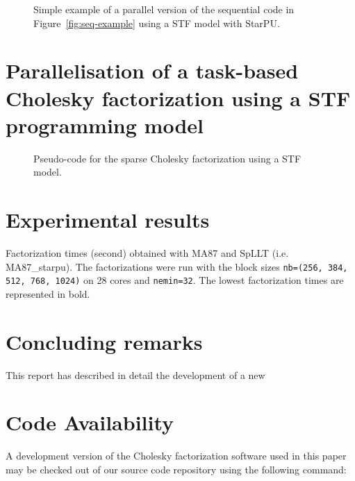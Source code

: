 \documentclass{article}
\newcommand{\starpu}{{StarPU}\xspace}
\begin{document}
\begin{figure}[!h]
  \centering 
  \caption{\label{fig:stf-starpu-example}Simple example of a parallel version
    of the sequential code in Figure~\ref{fig:seq-example} using a STF
    model with \starpu.}
\end{figure}

\section{Parallelisation of a task-based Cholesky factorization using a STF programming model}
\label{sec:experiments}



\begin{figure}[!h]
  \centering 
\caption{\label{fig:activation-pseudocode-1d}Pseudo-code for the
  sparse Cholesky factorization using a STF model.}
\end{figure}

\section{Experimental results}\label{sec:experiments}

\begin{table}[htbp]
    \begin{center}
      
    \end{center}
    \caption{Factorization times (second) obtained with MA87 and SpLLT
      (i.e. MA87\_starpu). The factorizations were run with the block
      sizes \texttt{nb=(256, 384, 512, 768, 1024)} on 28 cores and
      \texttt{nemin=32}. The lowest factorization times are
      represented in bold.}
\end{table}

\section{Concluding remarks}\label{sec:conclusions}
This report has described in detail the development of a new

 
\section*{Code Availability}
A development version of the Cholesky factorization software used in this 
paper may be checked out of
our source code repository using the following command:
\end{document}

